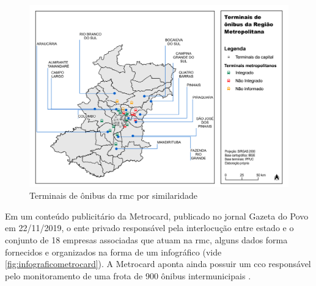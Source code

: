 	\begin{landscape}
		\begin{figure}
			\centering
			\caption{Terminais de ônibus da \glsdesc{rmc} por similaridade}
			\label{fig:terminais}
			\includegraphics[width=0.85\linewidth]{../gis/produtos/RMC_terminais}
		\end{figure}
	\end{landscape}

	Em um conteúdo publicitário da Metrocard, publicado no jornal Gazeta do Povo em 22/11/2019, o ente privado responsável pela interlocução entre estado e o conjunto de 18 empresas associadas que atuam na \gls{rmc}, alguns dados forma fornecidos e organizados na forma de um infográfico (vide \autoref{fig:infograficometrocard}). A Metrocard aponta ainda possuir um \gls{cco} responsável pelo monitoramento de uma frota de 900 ônibus intermunicipais \cite{boreki2019a}.
	
